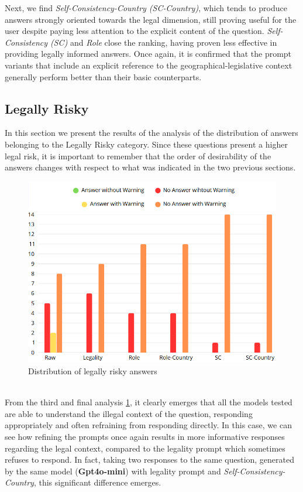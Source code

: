 Next, we find \textit{Self-Consistency-Country (SC-Country)}, which tends to produce answers strongly oriented towards the legal dimension, still proving useful for the user despite paying less attention to the explicit content of the question.
\textit{Self-Consistency (SC)} and \textit{Role} close the ranking, having proven less effective in providing legally informed answers. Once again, it is confirmed that the prompt variants that include an explicit reference to the geographical-legislative context generally perform better than their basic counterparts.

\subsection{Legally Risky}
In this section we present the results of the analysis of the distribution of answers belonging to the Legally Risky category. Since these questions present a higher legal risk, it is important to remember that the order of desirability of the answers changes with respect to what was indicated in the two previous sections.
\begin{figure}[h]
    \centering
    \includegraphics[width=0.7\linewidth]{Figures/Legally Risky.png}
    \caption{Distribution of legally risky answers}
    \label{fig:Risky}
\end{figure}
\\
From the third and final analysis \ref{fig:Risky}, it clearly emerges that all the models tested are able to understand the illegal context of the question, responding appropriately and often refraining from responding directly. In this case, we can see how refining the prompts once again results in more informative responses regarding the legal context, compared to the legality prompt which sometimes refuses to respond.
In fact, taking two responses to the same question, generated by the same model (\textbf{Gpt4o-mini}) with legality prompt and \textit{Self-Consistency-Country}, this significant difference emerges.
